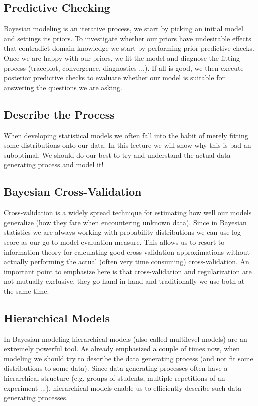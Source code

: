 \documentclass[fleqn,moreauthors,10pt]{ds_report}
\begin{document}
\subsection*{Predictive Checking}

Bayesian modeling is an iterative process, we start by picking an initial model and settings its priors. To investigate whether our priors have undesirable effects that contradict domain knowledge we start by performing prior predictive checks. Once we are happy with our priors, we fit the model and diagnose the fitting process (traceplot, convergence, diagnostics ...). If all is good, we then execute posterior predictive checks to evaluate whether our model is suitable for answering the questions we are asking.

\subsection*{Describe the Process}

When developing statistical models we often fall into the habit of merely fitting some distributions onto our data. In this lecture we will show why this is bad an suboptimal. We should do our best to try and understand the actual data generating process and model it!

\subsection*{Bayesian Cross-Validation}

Cross-validation is a widely spread technique for estimating how well our models generalize (how they fare when encountering unknown data). Since in Bayesian statistics we are always working with probability distributions we can use log-score as our go-to model evaluation measure. This allows us to resort to information theory for calculating good cross-validation approximations without actually performing the actual (often very time consuming) cross-validation. An important point to emphasize here is that cross-validation and regularization are not mutually exclusive, they go hand in hand and traditionally we use both at the same time.

\subsection*{Hierarchical Models}

In Bayesian modeling hierarchical models (also called multilevel models) are an extremely powerful tool. As already emphasized a couple of times now, when modeling we should try to describe the data generating process (and not fit some distributions to some data). Since data generating processes often have a hierarchical structure (e.g. groups of students, multiple repetitions of an experiment ...), hierarchical models enable us to efficiently describe such data generating processes.
\end{document}
